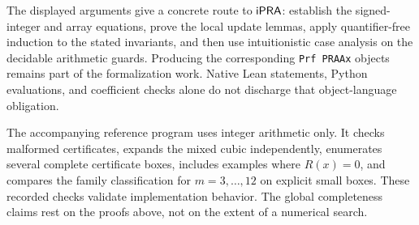 The displayed arguments give a concrete route to \(\mathsf{iPRA}\): establish
the signed-integer and array equations, prove the local update lemmas,
apply quantifier-free induction to the stated invariants, and then use
intuitionistic case analysis on the decidable arithmetic guards.
Producing the corresponding \texttt{Prf PRAAx} objects remains part of
the formalization work.  Native Lean statements, Python evaluations, and
coefficient checks alone do not discharge that object-language obligation.

The accompanying reference program uses integer arithmetic only.  It
checks malformed certificates, expands the mixed cubic independently,
enumerates several complete certificate boxes, includes examples where
\(R(x)=0\), and compares the family classification for \(m=3,\ldots,12\)
on explicit small boxes.  These recorded checks validate implementation
behavior.  The global completeness claims rest on the proofs above,
not on the extent of a numerical search.
